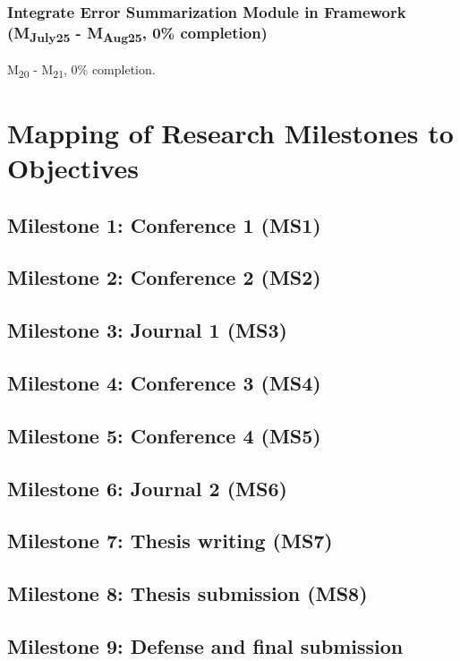 \subsubsection{Integrate Error Summarization Module in Framework (M\textsubscript{July25} - M\textsubscript{Aug25}, 0\% completion)}
M\textsubscript{20} - M\textsubscript{21}, 0\% completion.

\section{Mapping of Research Milestones to Objectives}
\subsection{Milestone 1: Conference 1 (MS1)}
\subsection{Milestone 2: Conference 2 (MS2)}
\subsection{Milestone 3: Journal 1 (MS3)}
\subsection{Milestone 4: Conference 3 (MS4)}
\subsection{Milestone 5: Conference 4 (MS5)} 

\subsection{Milestone 6: Journal 2 (MS6)}
\subsection{Milestone 7: Thesis writing (MS7)}
\subsection{Milestone 8: Thesis submission (MS8)}
\subsection{Milestone 9: Defense and final submission}


